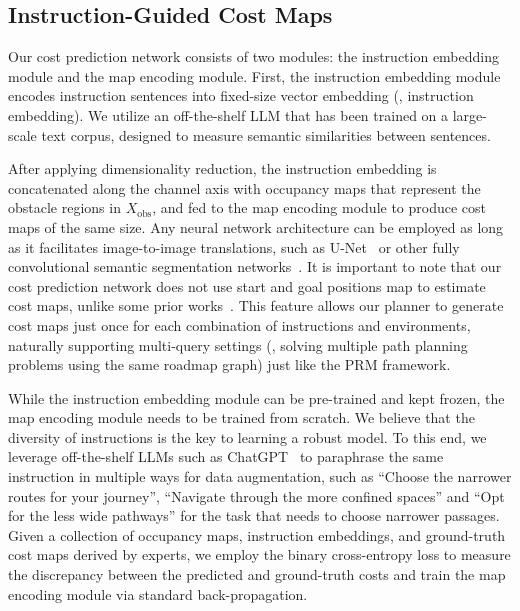 \subsection{Instruction-Guided Cost Maps}
Our cost prediction network consists of two modules: the instruction embedding module and the map encoding module. First, the instruction embedding module encodes instruction sentences into fixed-size vector embedding (\ie, instruction embedding). We utilize an off-the-shelf LLM that has been trained on a large-scale text corpus, designed to measure semantic similarities between sentences.

After applying dimensionality reduction, the instruction embedding is concatenated along the channel axis with occupancy maps that represent the obstacle regions in $X_{\text{obs}}$, and fed to the map encoding module to produce cost maps of the same size. Any neural network architecture can be employed as long as it facilitates image-to-image translations, such as U-Net~\cite{ronneberger2015u} or other fully convolutional semantic segmentation networks~\cite{garcia2017review}. It is important to note that our cost prediction network does not use start and goal positions map to estimate cost maps, unlike some prior works~\cite{ichter2018learning,yonetani2021path,takahashi2019learning,bhardwaj2017learning}. This feature allows our planner to generate cost maps just once for each combination of instructions and environments, naturally supporting multi-query settings (\ie, solving multiple path planning problems using the same roadmap graph) just like the PRM framework.

While the instruction embedding module can be pre-trained and kept frozen, the map encoding module needs to be trained from scratch. We believe that the diversity of instructions is the key to learning a robust model. To this end, we leverage off-the-shelf LLMs such as ChatGPT~\cite{openai2023gpt4} to paraphrase the same instruction in multiple ways for data augmentation, such as ``Choose the narrower routes for your journey'', ``Navigate through the more confined spaces'' and ``Opt for the less wide pathways'' for the task that needs to choose narrower passages. Given a collection of occupancy maps, instruction embeddings, and ground-truth cost maps derived by experts, we employ the binary cross-entropy loss to measure the discrepancy between the predicted and ground-truth costs and train the map encoding module via standard back-propagation.


